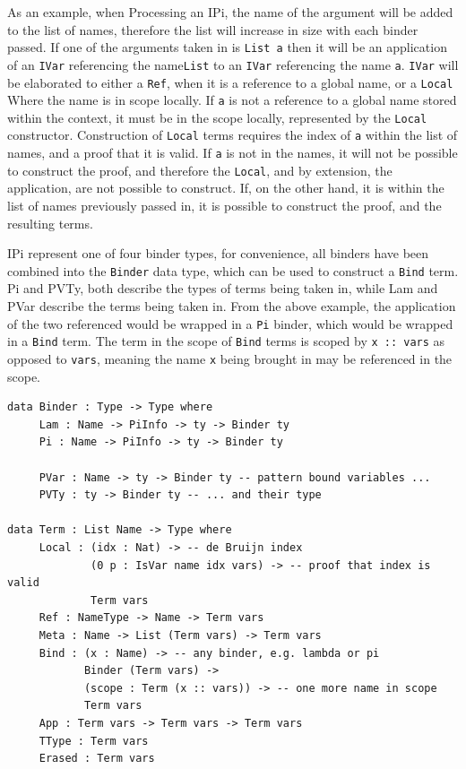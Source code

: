 \documentclass[a4paper]{article}
\begin{document}
As an example, when Processing an IPi, the name of the argument will
be added to the list of names, therefore the list will increase in size with
each binder passed. If one of the arguments taken in is \texttt{List a}
then it will be an application of an \texttt{IVar} referencing the name\texttt{List}
to an \texttt{IVar} referencing the name \texttt{a}. \texttt{IVar} will be elaborated
to either a \texttt{Ref}, when it is a reference to a global name, or a \texttt{Local}
Where the name is in scope locally. If \texttt{a} is not a reference
to a global name stored within the context, it must be in the scope locally, represented by the
\texttt{Local} constructor. Construction of \texttt{Local} terms requires the index of
\texttt{a} within the list of names, and a proof that it is valid. If \texttt{a} is not
in the names, it will not be possible to construct the proof, and therefore the \texttt{Local},
and by extension, the application, are not possible to construct. If, on the other hand, it is
within the list of names previously passed in, it is possible to construct the proof, and the
resulting terms.

IPi represent one of four binder types, for convenience, all binders have been combined into
the \texttt{Binder} data type, which can be used to construct a \texttt{Bind} term. 
Pi and PVTy, both describe the types of terms being taken in, while Lam and
PVar describe the terms being taken in. From the above example, the application of the
two referenced would be wrapped in a \texttt{Pi} binder, which would be wrapped in a \texttt{Bind} term.
The term in the scope of \texttt{Bind} terms is scoped by \texttt{x :: vars} as opposed to \texttt{vars},
meaning the name \texttt{x} being brought in may be referenced in the scope. 

\begin{center}
  \begin{verbatim} 
data Binder : Type -> Type where
     Lam : Name -> PiInfo -> ty -> Binder ty
     Pi : Name -> PiInfo -> ty -> Binder ty

     PVar : Name -> ty -> Binder ty -- pattern bound variables ...
     PVTy : ty -> Binder ty -- ... and their type
     
data Term : List Name -> Type where
	 Local : (idx : Nat) -> -- de Bruijn index
			 (0 p : IsVar name idx vars) -> -- proof that index is valid
			 Term vars
	 Ref : NameType -> Name -> Term vars 
	 Meta : Name -> List (Term vars) -> Term vars
	 Bind : (x : Name) -> -- any binder, e.g. lambda or pi
			Binder (Term vars) ->
			(scope : Term (x :: vars)) -> -- one more name in scope
			Term vars
	 App : Term vars -> Term vars -> Term vars 
	 TType : Term vars
	 Erased : Term vars
\end{verbatim}
\end{center}
\end{document}
